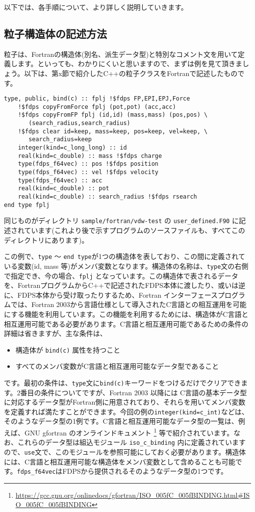 \documentclass[twocolumn,10pt]{jarticle}
\begin{document}
以下では、各手順について、より詳しく説明していきます。

\subsection{粒子構造体の記述方法}\label{subsec:how_to_implement_ptcl}
粒子は、Fortranの構造体(別名、派生データ型)と特別なコメント文を用いて定義します。といっても、わかりにくいと思いますので、まずは例を見て頂きましょう。以下は、第x節で紹介したC++の粒子クラスをFortranで記述したものです。
{\scriptsize
\begin{verbatim}
type, public, bind(c) :: fplj !$fdps FP,EPI,EPJ,Force
    !$fdps copyFromForce fplj (pot,pot) (acc,acc)
    !$fdps copyFromFP fplj (id,id) (mass,mass) (pos,pos) \
       (search_radius,search_radius)
    !$fdps clear id=keep, mass=keep, pos=keep, vel=keep, \
       search_radius=keep
    integer(kind=c_long_long) :: id
    real(kind=c_double) :: mass !$fdps charge
    type(fdps_f64vec) :: pos !$fdps position
    type(fdps_f64vec) :: vel !$fdps velocity
    type(fdps_f64vec) :: acc
    real(kind=c_double) :: pot
    real(kind=c_double) :: search_radius !$fdps rsearch
end type fplj  
\end{verbatim}
}\noindent
同じものがディレクトリ \texttt{sample/fortran/vdw-test} の \texttt{user\_defined.F90} に記述されています(これより後で示すプログラムのソースファイルも、すべてこのディレクトリにあります)。

この例で、\texttt{type} 〜 \texttt{end type}が1つの構造体を表しており、この間に定義されている変数(id, mass 等)がメンバ変数となります。構造体の名称は、\texttt{type}文の右側で指定でき、今の場合、\texttt{fplj} となっています。この構造体で表されるデータを、FortranプログラムからC++で記述されたFDPS本体に渡したり、或いは逆に、FDPS本体から受け取ったりするため、Fortran インターフェースプログラムでは、Fortran 2003から言語仕様として導入されたC言語との相互運用を可能にする機能を利用しています。この機能を利用するためには、構造体がC言語と相互運用可能である必要があります。C言語と相互運用可能であるための条件の詳細は省きますが、主な条件は、
\begin{itemize}
\item 構造体が \texttt{bind(c)} 属性を持つこと
\item すべてのメンバ変数がC言語と相互運用可能なデータ型であること
\end{itemize}
です。最初の条件は、\texttt{type}文に\texttt{bind(c)}キーワードをつけるだけでクリアできます。2番目の条件についてですが、Fortran 2003 以降には C言語の基本データ型に対応するデータ型がFortran側に用意されており、それらを用いてメンバ変数を定義すれば満たすことができます。今回の例の\texttt{integer(kind=c\_int)}などは、そのようなデータ型の1例です。C言語と相互運用可能なデータ型の一覧は、例えば、GNU gfortran のオンラインドキュメント
\footnote{\url{https://gcc.gnu.org/onlinedocs/gfortran/ISO_005fC_005fBINDING.html#ISO_005fC_005fBINDING}}
等で紹介されています。なお、これらのデータ型は組込モジュール \texttt{iso\_c\_binding} 内に定義されていますので、\texttt{use}文で、このモジュールを参照可能にしておく必要があります。構造体には、C言語と相互運用可能な構造体をメンバ変数として含めることも可能です。\texttt{fdps\_f64vec}はFDPSから提供されるそのようなデータ型の1つです。
\end{document}
